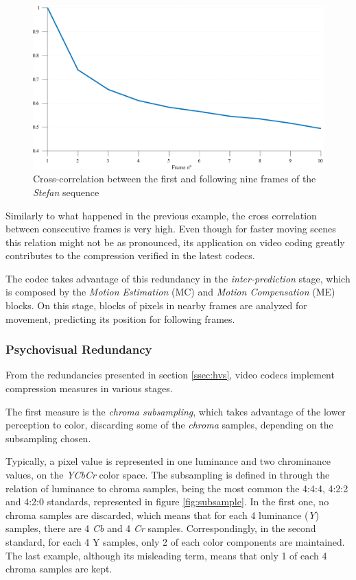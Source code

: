 \begin{figure}[h]
    \centering
    \includegraphics[width=\textwidth]{Sections/3AV1/Diagrams/intercorr.eps}
    \caption{Cross-correlation between the first and following nine frames of the \emph{Stefan} sequence}
    \label{fig:crosscorr}
\end{figure}

Similarly to what happened in the previous example, the cross correlation between consecutive frames is very high. Even though for faster moving scenes this relation might not be as pronounced, its application on video coding greatly contributes to the compression verified in the latest codecs. 

The codec takes advantage of this redundancy in the \emph{inter-prediction} stage, which is composed by the \emph{Motion Estimation} (MC) and \emph{Motion Compensation} (ME) blocks. On this stage, blocks of pixels in nearby frames are analyzed for movement, predicting its position for following frames.

\subsubsection{Psychovisual Redundancy}

From the redundancies presented in section \ref{ssec:hvs}, video codecs implement compression measures in various stages.

The first measure is the \emph{chroma subsampling}, which takes advantage of the lower perception to color, discarding some of the \emph{chroma} samples, depending on the subsampling chosen.

Typically, a pixel value is represented in one luminance and two chrominance values, on the \emph{YCbCr} color space. The subsampling is defined in through the relation of luminance to chroma samples, being the most common the 4:4:4, 4:2:2 and 4:2:0 standards, represented in figure \ref{fig:subsample}. In the first one, no chroma samples are discarded, which means that for each 4 luminance (\emph{Y}) samples, there are 4 \emph{Cb} and 4 \emph{Cr} samples. Correspondingly, in the second standard, for each 4 Y samples, only 2 of each color components are maintained. The last example, although its misleading term, means that only 1 of each 4 chroma samples are kept.

